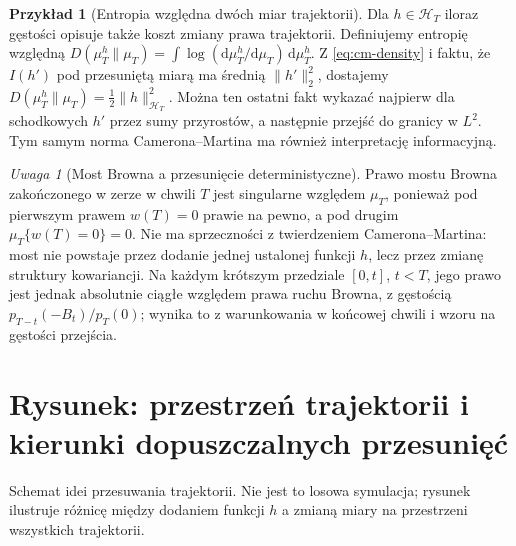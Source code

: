 \documentclass[11pt,a4paper,oneside]{report}
\numberwithin{equation}{chapter}
\theoremstyle{plain}
\theoremstyle{definition}
\newtheorem{przyklad}{Przykład}[chapter]
\theoremstyle{remark}
\newtheorem{uwaga}{Uwaga}[chapter]
\newcommand{\calH}{\mathcal{H}}
\newcommand{\dd}{\mathrm{d}}
\begin{document}
\begin{przyklad}[Entropia względna dwóch miar trajektorii]
Dla $h\in\calH_T$ iloraz gęstości opisuje także koszt
zmiany prawa trajektorii. Definiujemy entropię względną
$D(\mu_T^h\|\mu_T)=\int\log(\dd\mu_T^h/\dd\mu_T)
\,\dd\mu_T^h$. Z \eqref{eq:cm-density} i faktu, że
$I(h')$ pod przesuniętą miarą ma średnią $\|h'\|_2^2$,
dostajemy $D(\mu_T^h\|\mu_T)=\frac12\|h\|_{\calH_T}^2$.
Można ten ostatni fakt wykazać najpierw dla schodkowych
$h'$ przez sumy przyrostów, a następnie przejść do granicy
w $L^2$. Tym samym norma Camerona--Martina ma również
interpretację informacyjną.
\end{przyklad}

\begin{uwaga}[Most Browna a przesunięcie deterministyczne]
Prawo mostu Browna zakończonego w zerze w chwili $T$
jest singularne względem $\mu_T$, ponieważ pod pierwszym
prawem $w(T)=0$ prawie na pewno, a pod drugim
$\mu_T\{w(T)=0\}=0$. Nie ma sprzeczności z twierdzeniem
Camerona--Martina: most nie powstaje przez dodanie jednej
ustalonej funkcji $h$, lecz przez zmianę struktury kowariancji.
Na każdym krótszym przedziale $[0,t]$, $t<T$,
jego prawo jest jednak absolutnie ciągłe względem
prawa ruchu Browna, z gęstością
$p_{T-t}(-B_t)/p_T(0)$; wynika to z warunkowania
w końcowej chwili i wzoru na gęstości przejścia.
\end{uwaga}

\section{Rysunek: przestrzeń trajektorii i kierunki dopuszczalnych przesunięć}
\begin{center}
\par\smallskip\small Schemat idei przesuwania trajektorii. Nie jest to losowa
symulacja; rysunek ilustruje różnicę między dodaniem funkcji $h$
a zmianą miary na przestrzeni wszystkich trajektorii.
\end{center}
\end{document}
